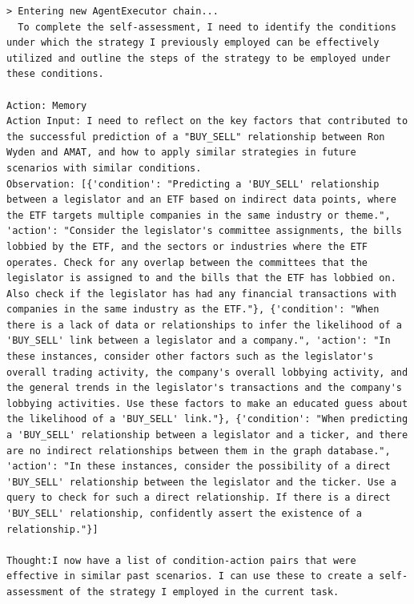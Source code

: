 \documentclass[15pt,letterpaper]{article}
\begin{document}
\begin{Verbatim}[breaklines=true, frame=single]
  > Entering new AgentExecutor chain...
  To complete the self-assessment, I need to identify the conditions under which the strategy I previously employed can be effectively utilized and outline the steps of the strategy to be employed under these conditions.
  
Action: Memory
Action Input: I need to reflect on the key factors that contributed to the successful prediction of a "BUY_SELL" relationship between Ron Wyden and AMAT, and how to apply similar strategies in future scenarios with similar conditions.
Observation: [{'condition': "Predicting a 'BUY_SELL' relationship between a legislator and an ETF based on indirect data points, where the ETF targets multiple companies in the same industry or theme.", 'action': "Consider the legislator's committee assignments, the bills lobbied by the ETF, and the sectors or industries where the ETF operates. Check for any overlap between the committees that the legislator is assigned to and the bills that the ETF has lobbied on. Also check if the legislator has had any financial transactions with companies in the same industry as the ETF."}, {'condition': "When there is a lack of data or relationships to infer the likelihood of a 'BUY_SELL' link between a legislator and a company.", 'action': "In these instances, consider other factors such as the legislator's overall trading activity, the company's overall lobbying activity, and the general trends in the legislator's transactions and the company's lobbying activities. Use these factors to make an educated guess about the likelihood of a 'BUY_SELL' link."}, {'condition': "When predicting a 'BUY_SELL' relationship between a legislator and a ticker, and there are no indirect relationships between them in the graph database.", 'action': "In these instances, consider the possibility of a direct 'BUY_SELL' relationship between the legislator and the ticker. Use a query to check for such a direct relationship. If there is a direct 'BUY_SELL' relationship, confidently assert the existence of a relationship."}]

Thought:I now have a list of condition-action pairs that were effective in similar past scenarios. I can use these to create a self-assessment of the strategy I employed in the current task.


\end{Verbatim}
\end{document}
